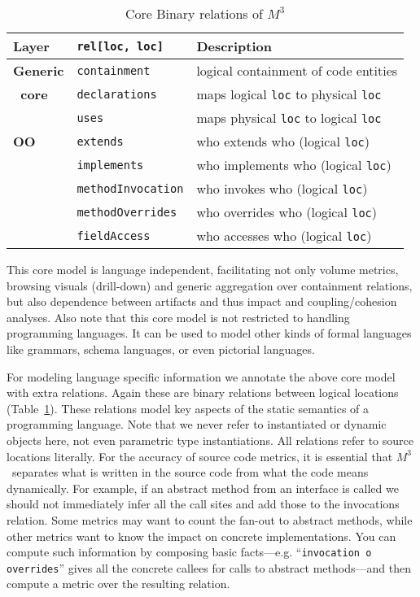 \documentclass[conference]{IEEEtran}
\newcommand{\mthree}{\ensuremath{M^3}\!\xspace}
\begin{document}
\begin{table}[t]
\caption{Core Binary relations of \mthree \label{table:core}}
\begin{tabularx}{\columnwidth}{|l|l|X|}\hline
 Layer & \lstinline!rel[loc, loc]! & Description \\ \hline 
\textbf{Generic} & \lstinline!containment! & logical containment of 
code entities \\
\textbf{~core} & \lstinline!declarations! & maps logical \lstinline!loc! to physical \lstinline!loc! \\
& \lstinline!uses! & maps physical \lstinline!loc! to logical \lstinline!loc! \\ \hline
 \textbf{OO} & \lstinline!extends! & who extends who (logical \lstinline!loc!) \\
& \lstinline!implements! & who implements who  (logical \lstinline!loc!) \\
& \lstinline!methodInvocation! & who invokes who (logical \lstinline!loc!) \\
& \lstinline!methodOverrides! & who overrides who (logical \lstinline!loc!) \\
& \lstinline!fieldAccess! & who accesses who (logical \lstinline!loc!)\\ \hline
\end{tabularx}
\vspace{-5mm}
\end{table}

This core model is language independent, facilitating not only volume metrics,
browsing visuals (drill-down) and generic aggregation over containment
relations, but also dependence between artifacts and thus impact and
coupling/cohesion analyses. Also note that this core model is not restricted
to handling programming languages. It can be used to model other kinds of
formal languages like grammars, schema languages, or even pictorial languages.

For modeling language specific information we annotate the above core model
with extra relations. Again these are binary relations between logical
locations (Table~\ref{table:core}). These relations model key aspects of the static semantics
of a programming language. Note that we never refer to instantiated or dynamic
objects here, not even parametric type instantiations. All relations refer to
source locations literally. 
For the accuracy of source code metrics, it is
essential that \mthree\  separates what is written in the source code from
what the code means dynamically. 
For example, if an abstract method from an
interface is called we should not immediately infer all the call sites and add
those to the invocations relation. Some metrics may want to count the fan-out
to abstract methods, while other metrics want to know the impact on concrete
implementations. You can compute such information by composing basic
facts---e.g. ``\lstinline!invocation o overrides!'' gives all the concrete callees
for calls to abstract methods---and then compute a metric over the resulting
relation.
\end{document}
